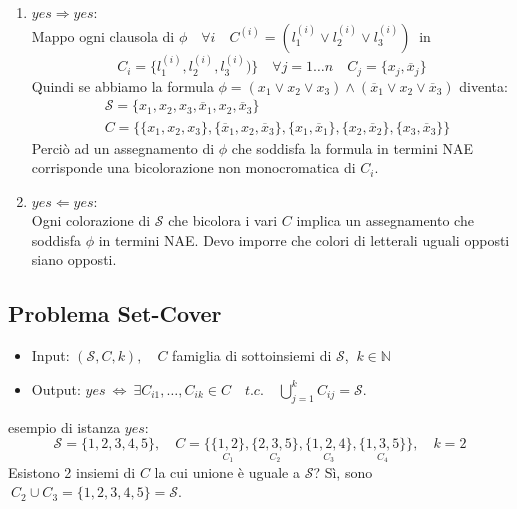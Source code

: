 \documentclass[a4paper]{article}
\theoremstyle{definition}
\newcommand{\N}{\mathbb{N}}
\begin{document}
			\begin{enumerate}
				\item $ yes \Rightarrow yes $:\\
				Mappo ogni clausola di $ \phi \quad \forall i\quad C^{(i)} = (l^{(i)}_1\vee l^{(i)}_2\vee l^{(i)}_3) \ $ in 
				\[
				C_i =\{l^{(i)}_1, l^{(i)}_2, l^{(i)}_3) \}\quad \forall j = 1\dots n\quad C_j =\{x_j, \overline{x}_j \} 
				\]
				Quindi se abbiamo la formula $ \phi = (x_1\vee x_2 \vee x_3)\wedge(\overline{x}_1\vee x_2\vee \overline{x}_3) $ diventa:
				\begin{align*}
				& \mathcal{S} = \{x_1, x_2, x_3, \overline{x}_1, x_2, \overline{x}_3\} \\
				& C = \big\lbrace \{x_1, x_2, x_3 \}, \{\overline{x}_1, x_2, \overline{x}_3\}, \{x_1, \overline{x}_1\}, \{x_2, \overline{x}_2\}, \{x_3, \overline{x}_3\}\big\rbrace
				\end{align*}
				Perciò ad un assegnamento di $ \phi $ che soddisfa la formula in termini NAE corrisponde una bicolorazione non monocromatica di $ C_i $.
				\item $ yes \Leftarrow yes $:\\
				Ogni colorazione di $ \mathcal{S} $ che bicolora i vari $ C $ implica un assegnamento che soddisfa $ \phi $ in termini NAE. Devo imporre che colori di letterali uguali opposti siano opposti.
			\end{enumerate}
			
			
		
		\subsection{Problema Set-Cover}
			\begin{itemize}
				\item Input: $ (\mathcal{S}, C, k),\quad C $ famiglia di sottoinsiemi di $ \mathcal{S} $, $ \ k\in \N $
				\item Output: $ yes\ \Leftrightarrow\ \exists C_{i 1},\dots, C_{i k} \in C\quad t.c.\quad \bigcup\limits^k_{j = 1} C_{i j} = \mathcal{S} $.
			\end{itemize}
			
			esempio di istanza $ yes $:
			\[
				\mathcal{S} = \{1, 2, 3, 4, 5\},\quad C = \big\lbrace \{\underset{C_1}{1, 2} \}, \{\underset{C_2}{2, 3, 5} \}, \{\underset{C_3}{1, 2, 4}\}, \{\underset{C_4}{1, 3, 5}\}\big\rbrace,\quad k = 2 
			\]
			Esistono 2 insiemi di $ C $ la cui unione è uguale a $ \mathcal{S} $? Sì, sono $ \ C_2 \cup C_3 = \{1, 2, 3, 4, 5\} = \mathcal{S} $.
			
\end{document}
